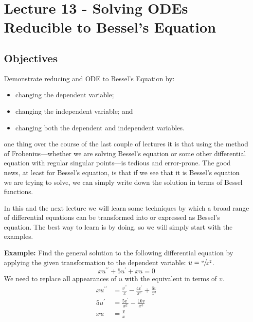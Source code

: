 \chapter{Lecture 13 - Solving ODEs Reducible to Bessel's Equation}
\label{ch:lec13}
\section{Objectives}
Demonstrate reducing and ODE to Bessel's Equation by:
\begin{itemize}
\item changing the dependent variable;
\item changing the independent variable; and
\item changing both the dependent and independent variables.
\end{itemize}

 one thing over the course of the last couple of lectures it is that using the method of Frobenius---whether we are solving Bessel's equation or some other differential equation with regular singular points---is tedious and error-prone.  The good news, at least for Bessel's equation, is that if we see that it is Bessel's equation we are trying to solve, we can simply write down the solution in terms of Bessel functions.

In this and the next lecture we will learn some techniques by which a broad range of differential equations can be transformed into or expressed as Bessel's equation.  The best way to learn is by doing, so we will simply start with the examples.

\vspace{0.5cm}

\noindent\textbf{Example:} Find the general solution to the following differential equation by applying the given transformation to the dependent variable: $u = \sfrac{v}{x^2}$.
\begin{equation*}
xu^{\prime \prime} + 5u^{\prime} + xu = 0
\end{equation*}
We need to replace all appearances of $u$ with the equivalent in terms of $v$.
\begin{align*}
xu^{\prime \prime} &= \frac{v^{\prime \prime}}{x} - \frac{4v^{\prime}}{x^2} + \frac{6v}{x^3} \\
5u^{\prime} &= \frac{5v^{\prime}}{x^2} - \frac{10v}{x^{3}} \\
xu &= \frac{v}{x}
\end{align*}

